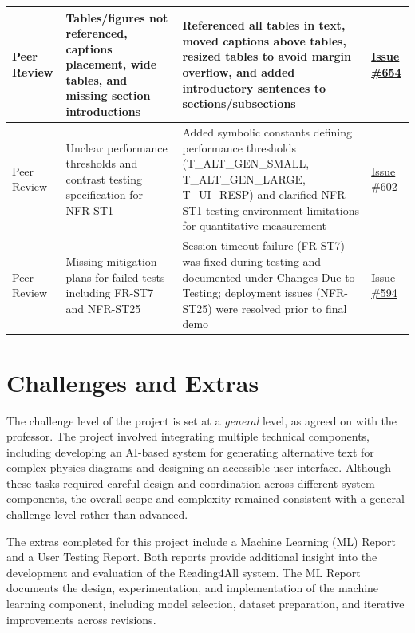\documentclass{article}
\begin{document}
\begin{longtable}{|p{2cm}|p{3.5cm}|p{4.5cm}|p{3cm}|}
Peer Review & Tables/figures not referenced, captions placement, wide tables, and missing section introductions & 
Referenced all tables in text, moved captions above tables, resized tables to avoid margin overflow, and added introductory sentences to sections/subsections &
\href{https://github.com/4G06-CAPSTONE-2025/Reading4All/issues/654}{Issue \#654} \\
\hline

Peer Review & Unclear performance thresholds and contrast testing specification for NFR-ST1 & 
Added symbolic constants defining performance thresholds (T\_ALT\_GEN\_SMALL, T\_ALT\_GEN\_LARGE, T\_UI\_RESP) and clarified NFR-ST1 testing environment limitations for quantitative measurement &
\href{https://github.com/4G06-CAPSTONE-2025/Reading4All/issues/602}{Issue \#602} \\
\hline

Peer Review & Missing mitigation plans for failed tests including FR-ST7 and NFR-ST25 & 
Session timeout failure (FR-ST7) was fixed during testing and documented under Changes Due to Testing; deployment issues (NFR-ST25) were resolved prior to final demo &
\href{https://github.com/4G06-CAPSTONE-2025/Reading4All/issues/594}{Issue \#594} \\
\hline
\end{longtable}

\section{Challenges and Extras}

The challenge level of the project is set at a \textit{general} level, as agreed on with the professor. The project involved integrating multiple technical components, including developing an AI-based system for generating alternative text for complex physics diagrams and designing an accessible user interface. Although these tasks required careful design and coordination across different system components, the overall scope and complexity remained consistent with a general challenge level rather than advanced.

The extras completed for this project include a Machine Learning (ML) Report and a User Testing Report. Both reports provide 
additional insight into the development and evaluation of the Reading4All system. The ML Report documents the design, 
experimentation, and implementation of the machine learning component, including model selection, dataset 
preparation, and iterative improvements across revisions.
\end{document}
